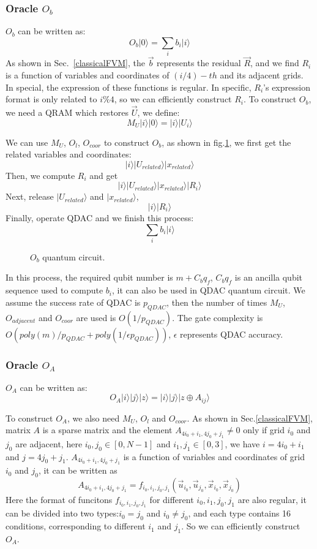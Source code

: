\documentclass[%
 reprint,
 amsmath,amssymb,
pra,
]{revtex4-1}
\begin{document}
\begin{itemize}
\subsubsection{Oracle $O_b$}
$O_b$ can be written as:
$$
O_b|0\rangle=\sum_i{b_i|i\rangle}
$$
As shown in Sec.~\ref{classicalFVM}, the $\vec{b}$ represents the residual $\vec{R}$, and we find $R_i$ is a function of variables and coordinates of $(i/4)-th$ and its adjacent grids. In special, the expression of these functions is regular. In specific, $R_i$'s expression format is only related to $i\%4$, so we can efficiently construct $R_i$. To construct $O_b$, we need a QRAM which restores $\vec{U}$, we define:
$$
M_U|i\rangle|0\rangle=|i\rangle|U_i\rangle
$$

We can use $M_U$, $O_l$, $O_{coor}$ to construct $O_b$, as shown in fig.\ref{OB}, we first get the related variables and coordinates:
$$
|i\rangle|U_{related}\rangle|x_{related}\rangle
$$
Then, we compute $R_i$ and get
$$
|i\rangle|U_{related}\rangle|x_{related}\rangle|R_i\rangle
$$
Next, release $|U_{related}\rangle$ and $|x_{related}\rangle$,
$$
|i\rangle|R_i\rangle
$$
Finally, operate QDAC and we finish this process:
$$
\sum_i{b_i|i\rangle}
$$

\begin{figure}[htbp]
    \caption{$O_b$ quantum circuit. }
    \label{OB}
\end{figure}

In this process, the required qubit number is $m+C_bq_f$, $C_bq_f$ is an ancilla qubit sequence used to compute $b_i$, it can also be used in QDAC quantum circuit. We assume the success rate of QDAC is $p_{QDAC}$, then the number of times $M_U$, $O_{adjacent}$ and $O_{coor}$ are used is $O(1/p_{QDAC})$. The gate complexity is $O(poly(m)/p_{QDAC}+poly(1/\epsilon p_{QDAC}))$, $\epsilon$ represents QDAC accuracy.


\subsubsection{Oracle $O_A$}
$O_A$ can be written as:
$$
O_A|i\rangle|j\rangle|z\rangle=|i\rangle|j\rangle|z\oplus A_{ij}\rangle
$$

To construct $O_A$, we also need $M_U$, $O_l$ and $O_{coor}$. As shown in Sec.\ref{classicalFVM}, matrix $A$ is a sparse matrix and the element $A_{4i_0+i_1,4j_0+j_1}\neq0$ only if grid $i_0$ and $j_0$ are adjacent, here $i_0,j_0\in[0,N-1]$ and $i_1,j_1\in[0,3]$, we have $i=4i_0+i_1$ and $j=4j_0+j_1$. $A_{4i_0+i_1,4j_0+j_1}$ is a function of variables and coordinates of grid $i_0$ and $j_0$, it can be written as
$$
A_{4i_0+i_1,4j_0+j_1}=f_{i_0,i_1,j_0,j_1}(\vec{u}_{i_0},\vec{u}_{j_0},\vec{x}_{i_0},\vec{x}_{j_0})
$$
Here the format of funcitons $f_{i_0,i_1,j_0,j_1}$ for different $i_0,i_1,j_0,j_1$ are also regular, it can be divided into two types:$i_0=j_0$ and $i_0\neq j_0$, and each type contains 16 conditions, corresponding to different $i_1$ and $j_1$. So we can efficiently construct $O_A$.


\end{itemize}
\end{document}
